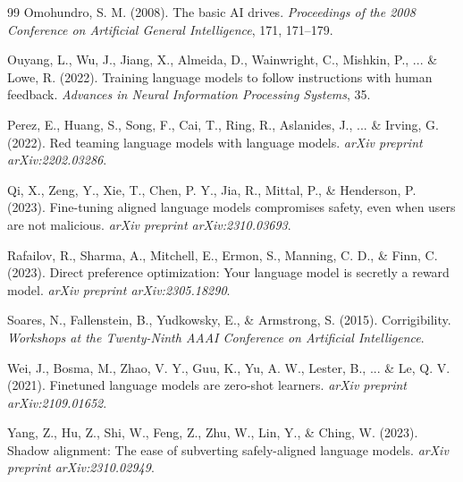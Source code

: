 \documentclass[10pt,letterpaper]{article}
\begin{document}
\begin{thebibliography}{99}
Omohundro, S. M. (2008).
\newblock The basic AI drives.
\newblock \textit{Proceedings of the 2008 Conference on Artificial General Intelligence}, 171, 171--179.

Ouyang, L., Wu, J., Jiang, X., Almeida, D., Wainwright, C., Mishkin, P., ... \& Lowe, R. (2022).
\newblock Training language models to follow instructions with human feedback.
\newblock \textit{Advances in Neural Information Processing Systems}, 35.

Perez, E., Huang, S., Song, F., Cai, T., Ring, R., Aslanides, J., ... \& Irving, G. (2022).
\newblock Red teaming language models with language models.
\newblock \textit{arXiv preprint arXiv:2202.03286}.

Qi, X., Zeng, Y., Xie, T., Chen, P. Y., Jia, R., Mittal, P., \& Henderson, P. (2023).
\newblock Fine-tuning aligned language models compromises safety, even when users are not malicious.
\newblock \textit{arXiv preprint arXiv:2310.03693}.

Rafailov, R., Sharma, A., Mitchell, E., Ermon, S., Manning, C. D., \& Finn, C. (2023).
\newblock Direct preference optimization: Your language model is secretly a reward model.
\newblock \textit{arXiv preprint arXiv:2305.18290}.

Soares, N., Fallenstein, B., Yudkowsky, E., \& Armstrong, S. (2015).
\newblock Corrigibility.
\newblock \textit{Workshops at the Twenty-Ninth AAAI Conference on Artificial Intelligence}.

Wei, J., Bosma, M., Zhao, V. Y., Guu, K., Yu, A. W., Lester, B., ... \& Le, Q. V. (2021).
\newblock Finetuned language models are zero-shot learners.
\newblock \textit{arXiv preprint arXiv:2109.01652}.

Yang, Z., Hu, Z., Shi, W., Feng, Z., Zhu, W., Lin, Y., \& Ching, W. (2023).
\newblock Shadow alignment: The ease of subverting safely-aligned language models.
\newblock \textit{arXiv preprint arXiv:2310.02949}.

\end{thebibliography}

\appendix
\end{document}
